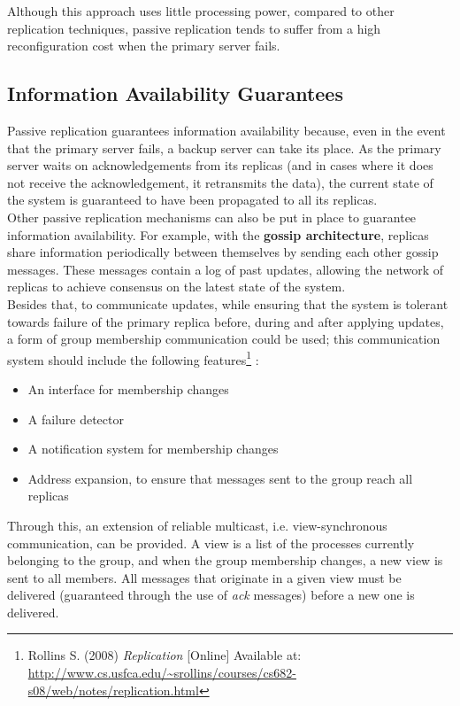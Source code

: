 \documentclass[11pt]{article}
\begin{document}
Although this approach uses little processing power, compared to other 
replication techniques, passive replication tends to suffer from a 
high reconfiguration cost when the primary server fails.

\subsection*{Information Availability Guarantees}
Passive replication guarantees information availability because, even in the 
event that the primary server fails, a backup server can take its place. 
As the primary server waits on acknowledgements from its replicas (and in cases 
where it does not receive the acknowledgement, it retransmits the data), the 
current state of the system is guaranteed to have been propagated to all its 
replicas.\\

Other passive replication mechanisms can also be put in place to guarantee 
information availability. For example, with the \textbf{gossip architecture}, 
replicas share information periodically between themselves by sending each other 
gossip messages. These messages contain a log of past updates, allowing the 
network of replicas to achieve consensus on the latest state of the system.\\

Besides that, to communicate updates, while ensuring that the system is 
tolerant towards failure of the primary replica before, during and after 
applying updates, a form of group membership communication could be used; this 
communication system should include the following features\footnote{Rollins S. 
(2008) \emph{Replication} [Online] Available at: \url{ 
http://www.cs.usfca.edu/~srollins/courses/cs682-s08/web/notes/replication.html}} 
:
\begin{itemize}
 \item An interface for membership changes
 \item A failure detector
 \item A notification system for membership changes
 \item Address expansion, to ensure that messages sent to the group reach all 
replicas
\end{itemize}
Through this, an extension of reliable multicast, i.e. 
view-synchronous communication, can be provided. A view is a list of the 
processes currently belonging to the group, and when the group membership 
changes, a new view is sent to all members. All messages that originate in a 
given view must be delivered (guaranteed through the use of \emph{ack} 
messages) before a new one is delivered.\\
\end{document}
